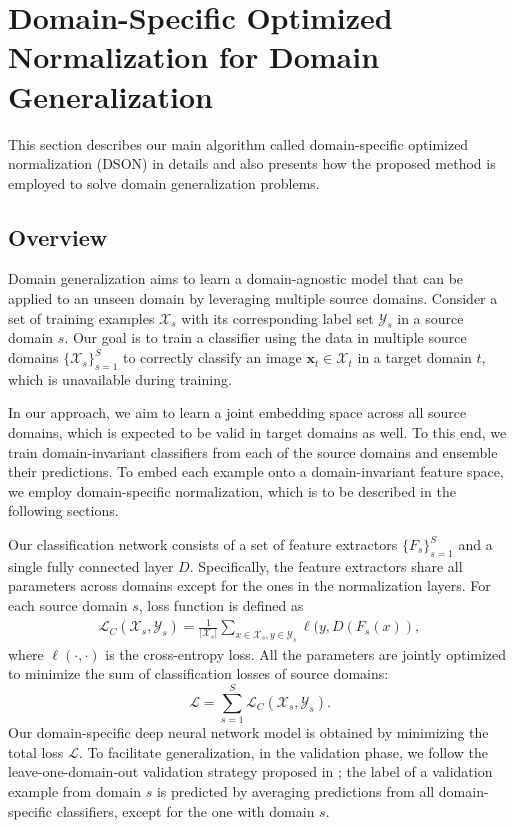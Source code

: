 \documentclass[runningheads]{llncs}
\begin{document}
\section{Domain-Specific Optimized Normalization for Domain Generalization}
\label{sec:method}
This section describes our main algorithm called domain-specific optimized normalization (DSON) in details and also presents how the proposed method is employed to solve domain generalization problems.


\subsection{Overview}

Domain generalization aims to learn a domain-agnostic model that can be applied to an unseen domain by leveraging multiple source domains.
Consider a set of training examples $\mathcal{X}_s$ with its corresponding label set $\mathcal{Y}_s$ in a source domain $s$.
Our goal is to train a classifier using the data in multiple source domains $\{\mathcal{X}_s\}_{s=1}^{S}$ to correctly classify an image $\mathbf{x}_t \in \mathcal{X}_t$ in a target domain $t$, which is unavailable during training.


In our approach, we aim to learn a joint embedding space across all source domains, which is expected to be valid in target domains as well.
To this end, we train domain-invariant classifiers from each of the source domains and ensemble their predictions.
To embed each example onto a domain-invariant feature space, we employ domain-specific normalization, which is to be described in the following sections.

Our classification network consists of a set of feature extractors $\{F_s\}_{s=1}^S$ and a single fully connected layer $D$.
Specifically, the feature extractors share all parameters across domains except for the ones in the normalization layers.
For each source domain $s$, loss function is defined as
\begin{align}
\mathcal{L}_C(\mathcal{X}_s, \mathcal{Y}_s) = \frac{1}{|\mathcal{X}_s|} \sum_{x \in \mathcal{X}_s, y\in \mathcal{Y}_s}{\ell(y, D(F_s(x))},
\end{align}
where $\ell(\cdot, \cdot)$ is the cross-entropy loss.
All the parameters are jointly optimized to minimize the sum of classification losses of source domains:
\begin{equation}
\label{eq:loss}
\mathcal{L} = \sum_{s=1}^{S}{\mathcal{L}_C(\mathcal{X}_s, \mathcal{Y}_s)}.
\end{equation}
Our domain-specific deep neural network model is obtained by minimizing the total loss $\mathcal{L}$.
{\color{black}
To facilitate generalization, in the validation phase, we follow the leave-one-domain-out validation strategy proposed in \cite{dinnocente2018domain};
the label of a validation example from domain $s$ is predicted by averaging predictions from all domain-specific classifiers, except for the one with domain $s$.
}
\end{document}
